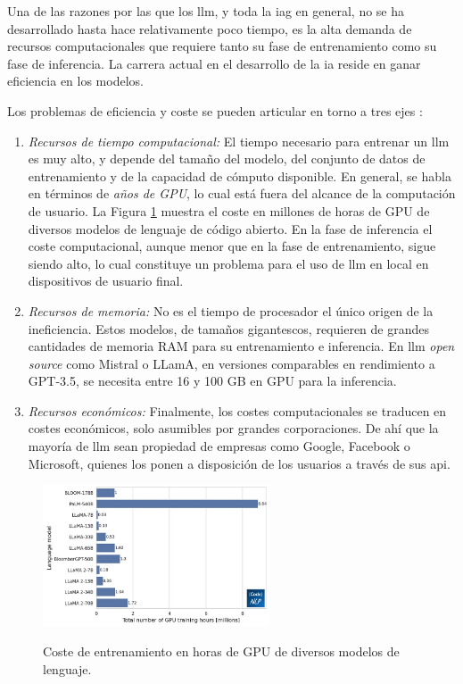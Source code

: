 Una de las razones por las que los \gls{llm}, y toda la \gls{iag} en general, no se ha desarrollado hasta hace relativamente poco tiempo, es la alta demanda de recursos computacionales que requiere tanto su fase de entrenamiento como su fase de inferencia. La carrera actual en el desarrollo de la \gls{ia} reside en ganar eficiencia en los modelos. 

Los problemas de eficiencia y coste se pueden articular en torno a tres ejes \citep{arunbijiRAGVsFinetuning}:

\begin{enumerate}[label=\alph*)]
    \item \textit{Recursos de tiempo computacional:} El tiempo necesario para entrenar un \gls{llm} es muy alto, y depende del tamaño del modelo, del conjunto de datos de entrenamiento y de la capacidad de cómputo disponible. En general, se habla en términos de \emph{años de GPU}, lo cual está fuera del alcance de la computación de usuario. La Figura \ref{fig:llm_gpu_training_hours} muestra el coste en millones de horas de GPU de diversos modelos de lenguaje de código abierto. En la fase de inferencia el coste computacional, aunque menor que en la fase de entrenamiento, sigue siendo alto, lo cual constituye un problema para el uso de \gls{llm} en local en dispositivos de usuario final.
    \item \textit{Recursos de memoria:} No es el tiempo de procesador el único origen de la ineficiencia. Estos modelos, de tamaños gigantescos, requieren de grandes cantidades de memoria RAM para su entrenamiento e inferencia. En \gls{llm} \emph{open source} como Mistral o LLamA, en versiones comparables en rendimiento a GPT-3.5, se necesita entre 16 y 100 GB en GPU para la inferencia. 
    \item \textit{Recursos económicos:} Finalmente, los costes computacionales se traducen en costes económicos, solo asumibles por grandes corporaciones. De ahí que la mayoría de \gls{llm} sean propiedad de empresas como Google, Facebook o Microsoft, quienes los ponen a disposición de los usuarios a través de sus \gls{api}.
\end{enumerate}

\begin{figure}[H]
    \caption[Coste de entrenamiento en horas de GPU de diversos modelos de lenguaje]{Coste de entrenamiento en horas de GPU de diversos modelos de lenguaje.}
    \centering
    \includegraphics[width=0.6\textwidth]{./figuras/llm_gpu_training_hours.png}
    \label{fig:llm_gpu_training_hours}
  \end{figure}

